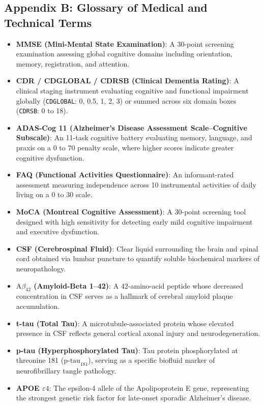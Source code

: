 \documentclass[11pt,a4paper]{article}
\begin{document}
\subsection*{Appendix B: Glossary of Medical and Technical Terms}
\label{app:glossary}
\begin{itemize}
    \item \textbf{MMSE (Mini-Mental State Examination)}: A 30-point screening examination assessing global cognitive domains including orientation, memory, registration, and attention.
    \item \textbf{CDR / CDGLOBAL / CDRSB (Clinical Dementia Rating)}: A clinical staging instrument evaluating cognitive and functional impairment globally (\texttt{CDGLOBAL}: 0, 0.5, 1, 2, 3) or summed across six domain boxes (\texttt{CDRSB}: 0 to 18).
    \item \textbf{ADAS-Cog 11 (Alzheimer's Disease Assessment Scale--Cognitive Subscale)}: An 11-task cognitive battery evaluating memory, language, and praxis on a 0 to 70 penalty scale, where higher scores indicate greater cognitive dysfunction.
    \item \textbf{FAQ (Functional Activities Questionnaire)}: An informant-rated assessment measuring independence across 10 instrumental activities of daily living on a 0 to 30 scale.
    \item \textbf{MoCA (Montreal Cognitive Assessment)}: A 30-point screening tool designed with high sensitivity for detecting early mild cognitive impairment and executive dysfunction.
    \item \textbf{CSF (Cerebrospinal Fluid)}: Clear liquid surrounding the brain and spinal cord obtained via lumbar puncture to quantify soluble biochemical markers of neuropathology.
    \item \textbf{$\text{A}\beta_{42}$ (Amyloid-Beta 1--42)}: A 42-amino-acid peptide whose decreased concentration in CSF serves as a hallmark of cerebral amyloid plaque accumulation.
    \item \textbf{t-tau (Total Tau)}: A microtubule-associated protein whose elevated presence in CSF reflects general cortical axonal injury and neurodegeneration.
    \item \textbf{p-tau (Hyperphosphorylated Tau)}: Tau protein phosphorylated at threonine 181 ($\text{p-tau}_{181}$), serving as a specific biofluid marker of neurofibrillary tangle pathology.
    \item \textbf{APOE $\varepsilon4$}: The epsilon-4 allele of the Apolipoprotein E gene, representing the strongest genetic risk factor for late-onset sporadic Alzheimer's disease.

\end{itemize}
\end{document}
